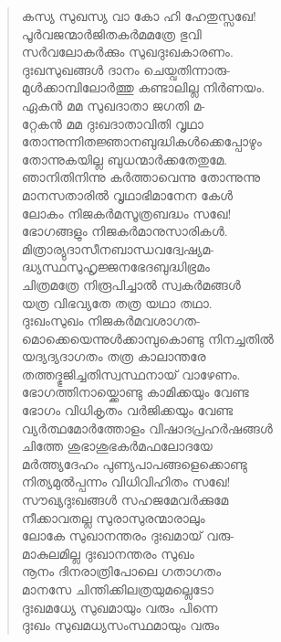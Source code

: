 \begin{verse}
കസ്യ സുഖസ്യ വാ കോ ഹി ഹേതുസ്സഖേ!\\
പൂര്‍വജന്മാര്‍ജിതകര്‍മമത്രേ ഭുവി\\
സര്‍വലോകര്‍ക്കും സുഖദുഃഖകാരണം.\\
ദുഃഖസുഖങ്ങള്‍ ദാനം ചെയ്വതിന്നാരു-\\
മുള്‍ക്കാമ്പിലോര്‍ത്തു കണ്ടാലില്ല നിര്‍ണയം.\\
ഏകന്‍ മമ സുഖദാതാ ജഗതി മ-\\
റ്റേകന്‍ മമ ദുഃഖദാതാവിതി വൃഥാ\\
തോന്നുന്നിതജ്ഞാനബുദ്ധികള്‍ക്കെപ്പോഴും\\
തോന്നുകയില്ല ബുധന്മാര്‍ക്കതേതുമേ.\\
ഞാനിതിനിന്നു കര്‍ത്താവെന്നു തോന്നുന്നു\\
മാനസതാരില്‍ വൃഥാഭിമാനേന കേള്‍\\
ലോകം നിജകര്‍മസൂത്രബദ്ധം സഖേ!\\
ഭോഗങ്ങളും നിജകര്‍മാനുസാരികള്‍.\\
മിത്രാര്യുദാസീനബാന്ധവദ്വേഷ്യമ-\\
ദ്ധ്യസ്ഥസുഹൃജ്ജനഭേദബുദ്ധിഭ്രമം\\
ചിത്രമത്രേ നിരൂപിച്ചാല്‍ സ്വകര്‍മങ്ങള്‍\\
യത്ര വിഭവ്യതേ തത്ര യഥാ തഥാ.\\
ദുഃഖംസുഖം നിജകര്‍മവശാഗത-\\
മൊക്കെയെന്നുള്‍ക്കാമ്പുകൊണ്ടു നിനച്ചതില്‍\\
യദ്യദ്യദാഗതം തത്ര കാലാന്തരേ\\
തത്തദ്ഭുജിച്ചതിസ്വസ്ഥനായ് വാഴേണം.\\
ഭോഗത്തിനായ്ക്കൊണ്ടു കാമിക്കയും വേണ്ട\\
ഭോഗം വിധികൃതം വര്‍ജിക്കയും വേണ്ട\\
വ്യര്‍ത്ഥമോര്‍ത്തോളം വിഷാദപ്രഹര്‍ഷങ്ങള്‍\\
ചിത്തേ ശുഭാശുഭകര്‍മഫലോദയേ\\
മര്‍ത്ത്യദേഹം പുണ്യപാപങ്ങളെക്കൊണ്ടു\\
നിത്യമുല്‍പ്പന്നം വിധിവിഹിതം സഖേ!\\
സൗഖ്യദുഃഖങ്ങള്‍ സഹജമേവര്‍ക്കുമേ\\
നീക്കാവതല്ല സുരാസുരന്മാരാലും\\
ലോകേ സുഖാനന്തരം ദുഃഖമായ് വരു-\\
മാകുലമില്ല ദുഃഖാനന്തരം സുഖം\\
നൂനം ദിനരാത്രിപോലെ ഗതാഗതം\\
മാനസേ ചിന്തിക്കിലത്രയുമല്ലെടോ\\
ദുഃഖമധ്യേ സുഖമായും വരും പിന്നെ\\
ദുഃഖം സുഖമധ്യസംസ്ഥമായും വരും\\

\end{verse}

